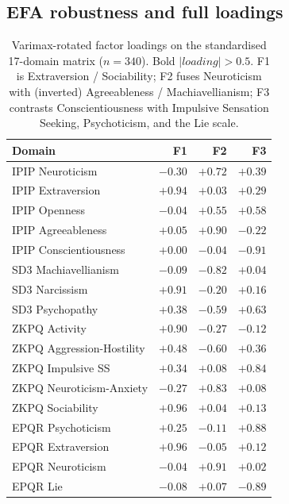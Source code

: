 \documentclass[11pt]{article}
\begin{document}
\subsection{EFA robustness and full loadings}

\begin{table}[t]
\centering
\small
\begin{tabular}{lrrr}
\toprule
Domain & F1 & F2 & F3 \\
\midrule
IPIP Neuroticism                  & $-0.30$       & $\mathbf{+0.72}$ & $+0.39$       \\
IPIP Extraversion                 & $\mathbf{+0.94}$ & $+0.03$       & $+0.29$       \\
IPIP Openness                     & $-0.04$       & $\mathbf{+0.55}$ & $\mathbf{+0.58}$ \\
IPIP Agreeableness                & $+0.05$       & $\mathbf{+0.90}$ & $-0.22$       \\
IPIP Conscientiousness            & $+0.00$       & $-0.04$       & $\mathbf{-0.91}$ \\
SD3 Machiavellianism              & $-0.09$       & $\mathbf{-0.82}$ & $+0.04$       \\
SD3 Narcissism                    & $\mathbf{+0.91}$ & $-0.20$       & $+0.16$       \\
SD3 Psychopathy                   & $+0.38$       & $\mathbf{-0.59}$ & $\mathbf{+0.63}$ \\
ZKPQ Activity                     & $\mathbf{+0.90}$ & $-0.27$       & $-0.12$       \\
ZKPQ Aggression-Hostility         & $+0.48$       & $\mathbf{-0.60}$ & $+0.36$       \\
ZKPQ Impulsive SS                 & $+0.34$       & $+0.08$       & $\mathbf{+0.84}$ \\
ZKPQ Neuroticism-Anxiety          & $-0.27$       & $\mathbf{+0.83}$ & $+0.08$       \\
ZKPQ Sociability                  & $\mathbf{+0.96}$ & $+0.04$       & $+0.13$       \\
EPQR Psychoticism                 & $+0.25$       & $-0.11$       & $\mathbf{+0.88}$ \\
EPQR Extraversion                 & $\mathbf{+0.96}$ & $-0.05$       & $+0.12$       \\
EPQR Neuroticism                  & $-0.04$       & $\mathbf{+0.91}$ & $+0.02$       \\
EPQR Lie                          & $-0.08$       & $+0.07$       & $\mathbf{-0.89}$ \\
\bottomrule
\end{tabular}
\caption{Varimax-rotated factor loadings on the standardised 17-domain matrix ($n=340$). Bold $|loading| > 0.5$. F1 is Extraversion / Sociability; F2 fuses Neuroticism with (inverted) Agreeableness / Machiavellianism; F3 contrasts Conscientiousness with Impulsive Sensation Seeking, Psychoticism, and the Lie scale.}
\label{tab:efa-loadings}
\end{table}
\end{document}
